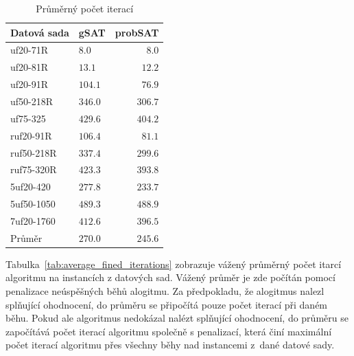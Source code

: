 \documentclass[twoside,twocolumn]{article}
\begin{document}
    \begin{table}
        \caption{Průměrný počet iterací}
        \centering
        \begin{tabular}{llr}
            \toprule
            Datová sada & gSAT    & probSAT \\
            \midrule
            uf20-71R    & $8.0$   & $8.0$   \\
            uf20-81R    & $13.1$  & $12.2$  \\
            uf20-91R    & $104.1$ & $76.9$  \\
            uf50-218R   & $346.0$ & $306.7$ \\
            uf75-325    & $429.6$ & $404.2$ \\
            ruf20-91R   & $106.4$ & $81.1$  \\
            ruf50-218R  & $337.4$ & $299.6$ \\
            ruf75-320R  & $423.3$ & $393.8$ \\
            5uf20-420   & $277.8$ & $233.7$ \\
            5uf50-1050  & $489.3$ & $488.9$ \\
            7uf20-1760  & $412.6$ & $396.5$ \\
            \midrule
            Průměr      & $270.0$ & $245.6$ \\
            \bottomrule
        \end{tabular}
        \label{tab:average_iterations}
    \end{table}

    Tabulka~\ref{tab:average_fined_iterations} zobrazuje vážený průměrný počet itarcí algoritmu na instancích z datových sad.
    Vážený průměr je zde počítán pomocí penalizace neúspěšných běhů alogitmu.
    Za předpokladu, že alogitmus nalezl splňující ohodnocení, do průměru se připočítá pouze počet iterací při daném běhu.
    Pokud ale algoritmus nedokázal nalézt splňující ohodnocení, do průměru se započítává počet iterací algoritmu společně s penalizací,
    která činí maximální počet iterací algoritmu přes všechny běhy nad instancemi z~dané datové sady.
\end{document}
